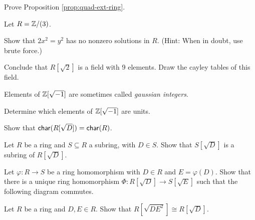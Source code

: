 \Exercises%

\begin{exercise}
Prove Proposition \ref{prop:quad-ext-ring}.
\end{exercise}

\begin{exercise}
Let \(R = \mathbb{Z}/(3)\).
\begin{proplist}
\item Show that \(2x^2 = y^2\) has no nonzero solutions in \(R\).
(Hint: When in doubt, use brute force.)
\item Conclude that \(R[\sqrt{2}]\) is a field with 9 elements.
Draw the cayley tables of this field.
\end{proplist}
\end{exercise}

\begin{exercise}
Elements of \(\mathbb{Z}[\sqrt{-1}]\) are sometimes called \emph{gaussian integers}.
\begin{proplist}
\item Determine which elements of \(\mathbb{Z}[\sqrt{-1}]\) are units.
\end{proplist}
\end{exercise}

\begin{exercise}
Show that \(\mathsf{char}(R[\sqrt{D}]) = \mathsf{char}(R)\).
\end{exercise}

\begin{exercise}
Let \(R\) be a ring and \(S \subseteq R\) a subring, with \(D \in S\).
Show that \(S[\sqrt{D}]\) is a subring of \(R[\sqrt{D}]\).
\end{exercise}

\begin{exercise}
Let \(\varphi : R \rightarrow S\) be a ring homomorphism with \(D \in R\) and \(E = \varphi(D)\).
Show that there is a unique ring homomorphism \(\Phi : R[\sqrt{D}] \rightarrow S[\sqrt{E}]\) such that the following diagram commutes.
\begin{center}
\end{center}
\end{exercise}

\begin{exercise}
Let \(R\) be a ring and \(D,E \in R\).
Show that \( R[\sqrt{DE^2}] \cong R[\sqrt{D}] \).
\end{exercise}

